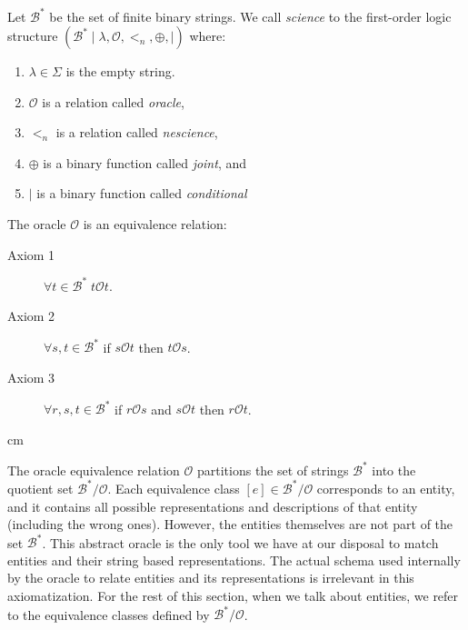 Let $\mathcal{B}^\ast$ be the set of finite binary strings. We call \emph{science} to the first-order logic structure $(\mathcal{B}^\ast \mid \lambda, \mathcal{O}, <_n, \oplus, \mid)$ where:

\vskip 0.25cm

\begin{enumerate}[label=(\roman*)]
\item $\lambda \in \Sigma$ is the empty string.
\item $\mathcal{O}$ is a relation called \emph{oracle},
\item $<_n$ is a relation called \emph{nescience},
\item $\oplus$ is a binary function called \emph{joint}, and
\item $\mid$ is a binary function called \emph{conditional}
\end{enumerate}

\vskip 0.25cm

The oracle $\mathcal{O}$ is an equivalence relation:

\vskip 0.25cm

\begin{description}
\item[Axiom 1] $\forall t \in \mathcal{B}^\ast \; t \mathcal{O} t$.
\item[Axiom 2] $\forall s , t \in \mathcal{B}^\ast$ if $s \mathcal{O} t$ then $t \mathcal{O} s$.
\item[Axiom 3] $\forall r, s , t \in \mathcal{B}^\ast$ if $r \mathcal{O} s$ and $s \mathcal{O} t$ then $r \mathcal{O} t$.
\end{description}

 cm

The oracle equivalence relation $\mathcal{O}$ partitions the set of strings $\mathcal{B}^\ast$ into the quotient set $\mathcal{B}^\ast / \mathcal{O}$. Each equivalence class $[e] \in \mathcal{B}^\ast / \mathcal{O}$ corresponds to an entity, and it contains all possible representations and descriptions of that entity (including the wrong ones). However, the entities themselves are not part of the set $\mathcal{B}^\ast$. This abstract oracle is the only tool we have at our disposal to match entities and their string based representations. The actual schema used internally by the oracle to relate entities and its representations is irrelevant in this axiomatization. For the rest of this section, when we talk about entities, we refer to the equivalence classes defined by $\mathcal{B}^\ast / \mathcal{O}$.

